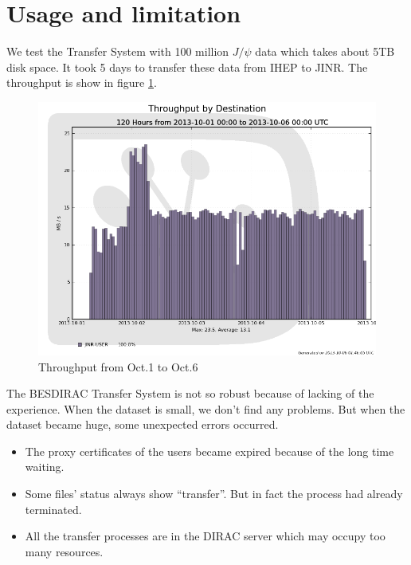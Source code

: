 \section{Usage and limitation}
We test the Transfer System with 100 million $J/\psi$ data 
which takes about 5TB disk space. It took 5 days to transfer 
these data from IHEP to JINR. The throughput is show in 
figure \ref{fig:throughput}.

\begin{figure}[h]
\includegraphics[width=.6\textwidth, keepaspectratio]{data/throughput-dest-1001-10-06.png}
\begin{minipage}[b]{.4\textwidth}
    \caption{\label{fig:throughput}Throughput from Oct.1 to Oct.6}
\end{minipage}
\end{figure}

The BESDIRAC Transfer System is not so robust
because of lacking of the experience.
When the dataset is small, we don't find any problems.
But when the dataset became huge, some unexpected errors occurred.
\begin{itemize}
    \item The proxy certificates of the users became expired
            because of the long time waiting.
    \item Some files' status always show ``transfer''.
            But in fact the process had already terminated.
    \item All the transfer processes are in the DIRAC server
            which may occupy too many resources.
\end{itemize}
